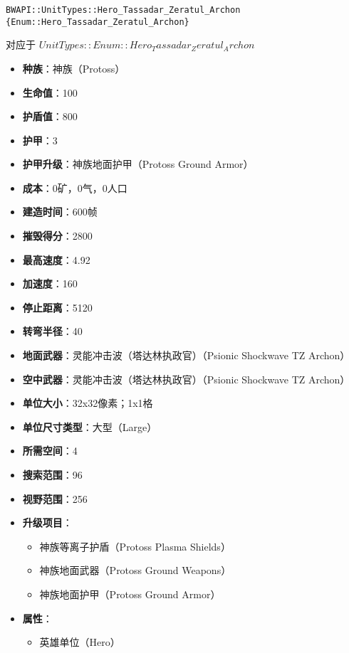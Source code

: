 \begin{tcolorbox}[colback=white, colframe=black!60!white, title=Hero\_Tassadar\_Zeratul\_Archon(), arc=0mm]
    \begin{verbatim}
BWAPI::UnitTypes::Hero_Tassadar_Zeratul_Archon {Enum::Hero_Tassadar_Zeratul_Archon}
    \end{verbatim}
    对应于  $ UnitTypes::Enum::Hero_Tassadar_Zeratul_Archon $ 
    \begin{itemize}
        \item \textbf{种族}：神族（Protoss）
        \item \textbf{生命值}：100
        \item \textbf{护盾值}：800
        \item \textbf{护甲}：3
        \item \textbf{护甲升级}：神族地面护甲（Protoss Ground Armor）
        \item \textbf{成本}：0矿，0气，0人口
        \item \textbf{建造时间}：600帧
        \item \textbf{摧毁得分}：2800
        \item \textbf{最高速度}：4.92
        \item \textbf{加速度}：160
        \item \textbf{停止距离}：5120
        \item \textbf{转弯半径}：40
        \item \textbf{地面武器}：灵能冲击波（塔达林执政官）（Psionic Shockwave TZ Archon）
        \item \textbf{空中武器}：灵能冲击波（塔达林执政官）（Psionic Shockwave TZ Archon）
        \item \textbf{单位大小}：32x32像素；1x1格
        \item \textbf{单位尺寸类型}：大型（Large）
        \item \textbf{所需空间}：4
        \item \textbf{搜索范围}：96
        \item \textbf{视野范围}：256
        \item \textbf{升级项目}：
            \begin{itemize}
                \item 神族等离子护盾（Protoss Plasma Shields）
                \item 神族地面武器（Protoss Ground Weapons）
                \item 神族地面护甲（Protoss Ground Armor）
            \end{itemize}
        \item \textbf{属性}：
            \begin{itemize}
                \item 英雄单位（Hero）
            \end{itemize}
    \end{itemize}
\end{tcolorbox}

